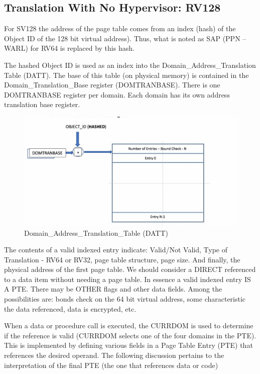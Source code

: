 \documentclass{article}
\begin{document}
\subsection{Translation With No Hypervisor: RV128}

For SV128 the address of the page table comes from an index (hash) of the Object ID of the  128 bit virtual address).  Thus, what is noted as SAP (PPN – WARL) for RV64 is replaced by this  hash. 

The hashed Object ID is used as an index into the Domain\_Address\_Translation Table (DATT).  The base of this table (on physical memory) is contained in the Domain\_Translation\_Base register  (DOMTRANBASE). There is one DOMTRANBASE register per domain.  Each domain has its own address translation base register.

         
\begin{figure}
\includegraphics[scale=.4]{figures/figure4a_datt_translation_table.jpg}
\caption{Domain\_Address\_Translation\_Table (DATT)}
\end{figure}

The contents of a valid indexed entry indicate:  Valid/Not Valid, Type of Translation -  RV64 or RV32,  page table structure,  page size.  And finally, the physical address of the first page table. We should consider a DIRECT referenced to a data item without needing a page table.  In essence a valid indexed entry IS A PTE. There may be OTHER  flags and other data fields.  Among the possibilities are:  bonds check on the 64 bit virtual address,  some characteristic   the data referenced, data is encrypted, etc.


When a data or procedure call is executed,  the CURRDOM is used to determine if the reference is valid (CURRDOM selects one of the four domains in the PTE).  This is implemented by defining various fields in a Page Table Entry  (PTE) that references the desired operand.  The following discussion pertains to the interpretation of the final PTE (the one that references data or code)
\end{document}
